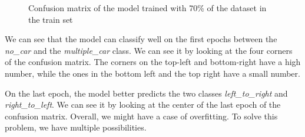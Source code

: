 \begin{figure}[H]
    \centering
    \qquad
    \caption{Confusion matrix of the model trained with 70\% of the dataset in the train set}
    \label{fig:confusion_matrix}
\end{figure}

We can see that the model can classify well on the first epochs between the \textit{no\_car} and the \textit{multiple\_car} class. We can see it by looking at the four corners of the confusion matrix. The corners on the top-left and bottom-right have a high number, while the ones in the bottom left and the top right have a small number.

On the last epoch, the model better predicts the two classes \textit{left\_to\_right} and \textit{right\_to\_left}. We can see it by looking at the center of the last epoch of the confusion matrix. Overall, we might have a case of overfitting. To solve this problem, we have multiple possibilities.

